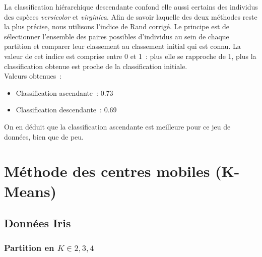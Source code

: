 \documentclass[a4paper,10pt]{report}
\begin{document}
La classification hiérarchique descendante confond elle aussi certains des individus des espèces \textit{versicolor} et \textit{virginica}.
Afin de savoir laquelle des deux méthodes reste la plus précise, nous utilisons l'indice de Rand corrigé. Le principe est de sélectionner l'ensemble des paires possibles d'individus au sein de chaque partition et comparer leur classement au classement initial qui est connu. La valeur de cet indice est comprise entre 0 et 1~: plus elle se rapproche de 1, plus la classification obtenue est proche de la classification initiale.\\

Valeurs obtenues~:
\begin{itemize}
	\item Classification ascendante~: 0.73
	\item Classification descendante~: 0.69
\end{itemize}

On en déduit que la classification ascendante est meilleure pour ce jeu de données, bien que de peu.




\chapter{Méthode des centres mobiles (K-Means)}



\section{Données Iris}


\subsection{Partition en $K \in {2,3,4}$}
\end{document}
